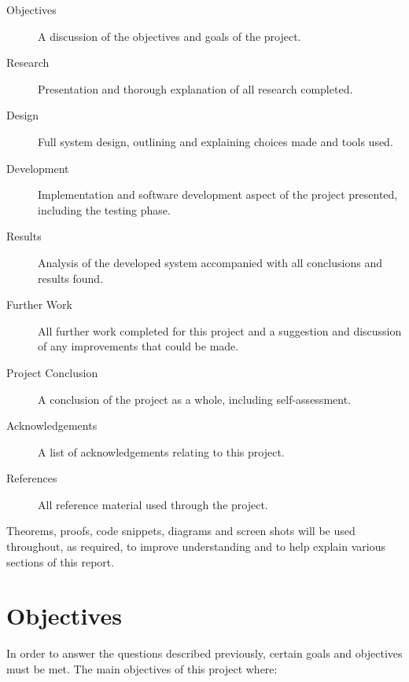 \documentclass[a4paper,10pt]{report}
\begin{document}
\begin{description}
  \item[Objectives] A discussion of the objectives and goals of the project.
  \item[Research] Presentation and thorough explanation of all research completed.
  \item[Design] Full system design, outlining and explaining choices made and tools used. 
  \item[Development] Implementation and software development aspect of the project presented, including the testing phase.
  \item[Results] Analysis of the developed system accompanied with all conclusions and results found. 
  \item[Further Work] All further work completed for this project and a suggestion and discussion of any improvements that could be made.
  \item[Project Conclusion] A conclusion of the project as a whole, including self-assessment.
  \item[Acknowledgements] A list of acknowledgements relating to this project.
  \item[References] All reference material used through the project.
\end{description}

Theorems, proofs, code snippets, diagrams and screen shots will be used throughout, as required, to improve understanding and to help explain various sections of this report. 


\chapter{Objectives} %

In order to answer the questions described previously, certain goals and objectives must be met. The main objectives of this project where: 
\end{document}
